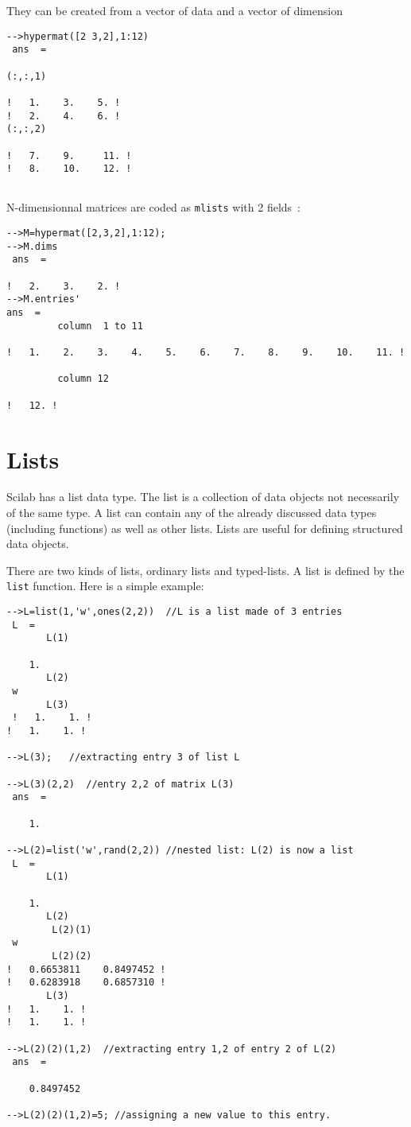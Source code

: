 They can be created from a vector of data and a vector of dimension 

\begin{verbatim}
-->hypermat([2 3,2],1:12)
 ans  =
 
(:,:,1)
 
!   1.    3.    5. !
!   2.    4.    6. !
(:,:,2)
 
!   7.    9.     11. !
!   8.    10.    12. !
 
\end{verbatim}

N-dimensionnal matrices are coded as {\tt mlists} with 2 fields~:
\begin{verbatim}
-->M=hypermat([2,3,2],1:12);
-->M.dims
 ans  =
 
!   2.    3.    2. !
-->M.entries'
ans  =
         column  1 to 11
 
!   1.    2.    3.    4.    5.    6.    7.    8.    9.    10.    11. !
 
         column 12
 
!   12. !
\end{verbatim}


\section{Lists}
\label{s2.5}

	Scilab has a list data type.  The list is a collection of data
objects not necessarily of the same type.  A list can contain any of
the already discussed data types (including functions) as well as
other lists.  Lists are useful for defining structured data objects.

There are two kinds of lists, ordinary lists and typed-lists.
A list is defined by the {\tt list} function. Here is a simple
example:

\begin{verbatim}
-->L=list(1,'w',ones(2,2))  //L is a list made of 3 entries
 L  =
       L(1)
 
    1.  
       L(2)
 w   
       L(3)
 !   1.    1. !
!   1.    1. !

-->L(3);   //extracting entry 3 of list L

-->L(3)(2,2)  //entry 2,2 of matrix L(3)
 ans  =
 
    1.  

-->L(2)=list('w',rand(2,2)) //nested list: L(2) is now a list
 L  =
       L(1)
 
    1.  
       L(2)
        L(2)(1)
 w   
        L(2)(2)
!   0.6653811    0.8497452 !
!   0.6283918    0.6857310 !
       L(3)
!   1.    1. !
!   1.    1. !

-->L(2)(2)(1,2)  //extracting entry 1,2 of entry 2 of L(2)
 ans  =
 
    0.8497452  

-->L(2)(2)(1,2)=5; //assigning a new value to this entry.

\end{verbatim}

